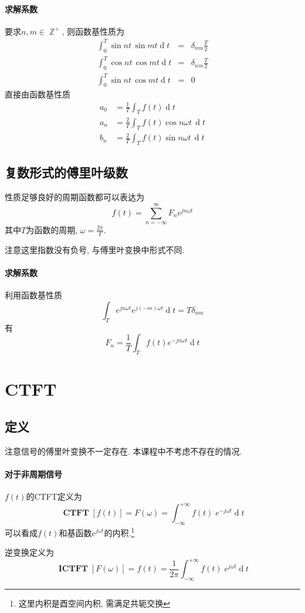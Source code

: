 \documentclass{ctexart}
\DeclareMathOperator{\CTFT}{\mathbf{CTFT}}
\DeclareMathOperator{\ICTFT}{\mathbf{ICTFT}}
\DeclareMathOperator{\ud}{\mathrm{d}}
\DeclareMathOperator{\Zset}{\mathbb{Z}}
\begin{document}
\paragraph{求解系数}
    要求$n, m \in \Zset^+$, 则函数基性质为\begin{eqnarray*}
        \int_0^{T} \sin nt\, \sin mt \ud t &=& \delta_{nm} \frac{T}{2}\\
        \int_0^{T} \cos nt\, \cos mt \ud t &=& \delta_{nm} \frac{T}{2} \\
        \int_0^{T} \sin nt\, \cos mt \ud t &=& 0
    \end{eqnarray*}
    直接由函数基性质\begin{align*}
        a_0 &= \frac{1}{T} \int_T f(t) \ud t\\
        a_n &= \frac{2}{T} \int_T f(t) \cos n\omega t \,\ud t\\
        b_n &= \frac{2}{T} \int_T f(t) \sin n\omega t \,\ud t
    \end{align*}
\subsection{复数形式的傅里叶级数}
    性质足够良好的周期函数都可以表达为\[
        f(t) = \sum_{n = -\infty}^{\infty} F_n e^{j n \omega t}
    \]其中$T$为函数的周期, $\omega = \frac{2\pi}{T}$.\par
    注意这里指数没有负号, 与傅里叶变换中形式不同.
\paragraph{求解系数}
    利用函数基性质 \[
        \int_T e^{j n \omega t} e^{j (-m) \omega t} \ud t = T \delta_{nm}\]
    有\[
        F_n = \frac{1}{T} \int_T f(t) e^{-j n \omega t} \ud t\]

\section{CTFT}
\subsection{定义}
    注意信号的傅里叶变换不一定存在. 本课程中不考虑不存在的情况.
\paragraph{对于非周期信号} $f(t)$的CTFT定义为 \[
    \CTFT[f(t)] = F(\omega) = \int_{-\infty}^{+\infty} f(t)\; e^{-j \omega t} \ud t \]
可以看成$f(t)$和基函数$e^{j \omega t}$的内积.\footnote{这里内积是酉空间内积, 需满足共轭交换}\par
    逆变换定义为 \[
    \ICTFT[F(\omega)] = f(t) = \frac{1}{2\pi} \int_{-\infty}^{+\infty} f(t)\; e^{j \omega t} \ud t \]
\end{document}
